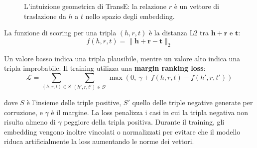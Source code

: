 \begin{figure}[ht]
\centering
{}
\caption{L'intuizione geometrica di TransE: la relazione $\mathit{r}$ è un vettore di traslazione da $\mathit{h}$ a $\mathit{t}$ nello spazio degli embedding.}
\label{fig:transe_geometry}
\end{figure}

La funzione di scoring per una tripla $(h, r, t)$ è la distanza L2 tra $\mathbf{h} + \mathbf{r}$ e $\mathbf{t}$:
\begin{equation}
f(h, r, t) = \|\mathbf{h} + \mathbf{r} - \mathbf{t}\|_2
\end{equation}

Un valore basso indica una tripla plausibile, mentre un valore alto indica una tripla improbabile. Il training utilizza una \textbf{margin ranking loss}:
\begin{equation}
\mathcal{L} = \sum_{(h,r,t) \in S} \sum_{(h',r,t') \in S'} \max\left(0,\ \gamma + f(h,r,t) - f(h',r,t')\right)
\end{equation}

dove $S$ è l'insieme delle triple positive, $S'$ quello delle triple negative generate per corruzione, e $\gamma$ è il margine. La loss penalizza i casi in cui la tripla negativa non risulta almeno di $\gamma$ peggiore della tripla positiva. Durante il training, gli embedding vengono inoltre vincolati o normalizzati per evitare che il modello riduca artificialmente la loss aumentando le norme dei vettori.

